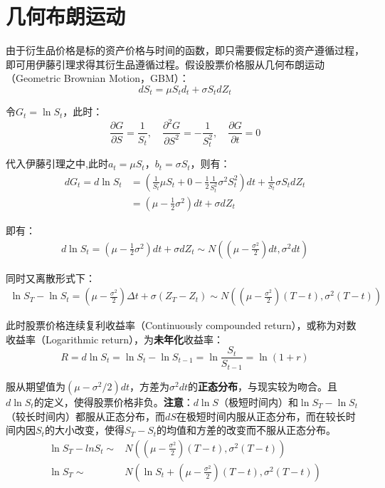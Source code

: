 \documentclass[11pt]{article}
\begin{document}
\section{几何布朗运动}

由于衍生品价格是标的资产价格与时间的函数，即只需要假定标的资产遵循过程，即可用伊藤引理求得其衍生品遵循过程。假设股票价格服从几何布朗运动（Geometric Brownian Motion，GBM）：
\begin{equation*}
    dS_t = \mu S_t d_t + \sigma S_t dZ_t
\end{equation*}

令$G_t = \ln S_t$，此时：
\begin{equation*}
    \frac{\partial G}{\partial S} = \frac{1}{S_t}, \quad
    \frac{\partial^2 G}{\partial S^2} = -\frac{1}{S_t^2}, \quad
    \frac{\partial G}{\partial t} = 0
\end{equation*}

代入伊藤引理之中,此时$a_t=\mu S_t$，$b_t=\sigma S_t$，则有：
\begin{align*}
    dG_t = d \ln S_t & = \left( \frac{1}{S_t}\mu S_t + 0 - \frac{1}{2} \frac{1}{S_t^2} \sigma^2 S_t^2 \right) dt + \frac{1}{S_t}\sigma S_t dZ_t \\
    & = \left( \mu - \frac{1}{2}\sigma^2\right)dt + \sigma dZ_t
\end{align*}

即有：
\begin{align*}
    d\ln S_t= \left( \mu - \frac{1}{2}\sigma^2\right) dt + \sigma dZ_t \sim N \left( (\mu-\frac{\sigma^2}{2})dt, \sigma^2 dt \right)
\end{align*}

同时又离散形式下：
\begin{align*}
    \ln S_T - \ln S_t = \left( \mu - \frac{\sigma^2}{2} \right) \Delta t + \sigma (Z_T - Z_t) \sim N \left((\mu-\frac{\sigma^2}{2})(T-t), \sigma^2(T-t) \right)
\end{align*}

此时股票价格连续复利收益率（Continuously compounded return），或称为对数收益率（Logarithmic return），为\textbf{未年化}收益率：
\begin{equation}
    R = d\ln S_t= \ln S_t - \ln S_{t-1} = \ln \frac{S_t}{S_{t-1}} = \ln (1+r)
\end{equation}

服从期望值为$(\mu - \sigma^2/2)dt$，方差为$\sigma^2 dt$的\textbf{正态分布}，与现实较为吻合。且$d\ln S_t$的定义，使得股票价格非负。\textbf{注意}：$d\ln S$（极短时间内）和$\ln S_T - \ln S_t$（较长时间内）都服从正态分布，而$dS$在极短时间内服从正态分布，而在较长时间内因$S_t$的大小改变，使得$S_T - S_t$的均值和方差的改变而不服从正态分布。
\begin{align*}
    \ln S_T - ln S_t \sim & N \left( (\mu-\frac{\sigma^2}{2})(T-t), \sigma^2(T-t)\right) \\
    \ln S_T  \sim & N \left(\ln S_t + (\mu-\frac{\sigma^2}{2})(T-t), \sigma^2(T-t)\right)
\end{align*}
\end{document}
